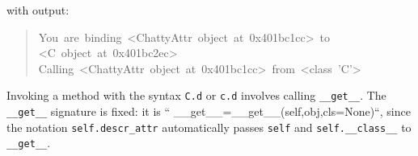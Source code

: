 \documentclass[10pt,english]{article}
\begin{document}
with output:
\begin{quote}
\begin{ttfamily}\begin{flushleft}
\mbox{You~are~binding~<ChattyAttr~object~at~0x401bc1cc>~to~}\\
\mbox{<C~object~at~0x401bc2ec>}\\
\mbox{Calling~<ChattyAttr~object~at~0x401bc1cc>~from~<class~'C'>}
\end{flushleft}\end{ttfamily}
\end{quote}

Invoking a method with the syntax \texttt{C.d} or \texttt{c.d} involves calling
\texttt{{\_}{\_}get{\_}{\_}}. The \texttt{{\_}{\_}get{\_}{\_}} signature is fixed: it is
`` {\_}{\_}get{\_}{\_}={\_}{\_}get{\_}{\_}(self,obj,cls=None)``, since the notation
\texttt{self.descr{\_}attr} automatically passes \texttt{self} and \texttt{self.{\_}{\_}class{\_}{\_}} to 
\texttt{{\_}{\_}get{\_}{\_}}.
\end{document}
